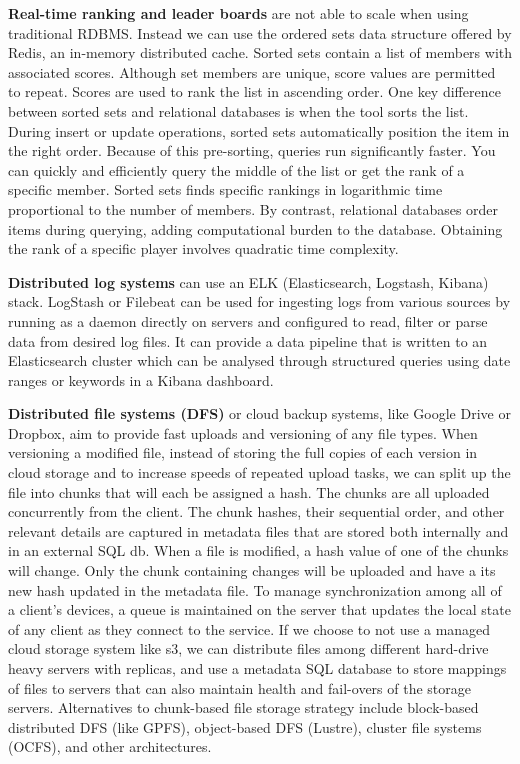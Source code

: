 \documentclass{article}
\begin{document}
    \textbf{Real-time ranking and leader boards} are not able to scale when using traditional RDBMS. Instead we can use the ordered sets data structure offered by Redis, an in-memory distributed cache. Sorted sets contain a list of members with associated scores. Although set members are unique, score values are permitted to repeat. Scores are used to rank the list in ascending order. One key difference between sorted sets and relational databases is when the tool sorts the list. During insert or update operations, sorted sets automatically position the item in the right order. Because of this pre-sorting, queries run significantly faster. You can quickly and efficiently query the middle of the list or get the rank of a specific member. Sorted sets finds specific rankings in logarithmic time proportional to the number of members. By contrast, relational databases order items during querying, adding computational burden to the database. Obtaining the rank of a specific player involves quadratic time complexity.
    
    \textbf{Distributed log systems} can use an ELK (Elasticsearch, Logstash, Kibana) stack. LogStash or Filebeat can be used for ingesting logs from various sources by running as a daemon directly on servers and configured to read, filter or parse data from desired log files. It can provide a data pipeline that is written to an Elasticsearch cluster which can be analysed through structured queries using date ranges or keywords in a Kibana dashboard.
    
    \textbf{Distributed file systems (DFS)} or cloud backup systems, like Google Drive or Dropbox, aim to provide fast uploads and versioning of any file types. When versioning a modified file, instead of storing the full copies of each version in cloud storage and to increase speeds of repeated upload tasks, we can split up the file into chunks that will each be assigned a hash. The chunks are all uploaded concurrently from the client. The chunk hashes, their sequential order, and other relevant details are captured in metadata files that are stored both internally and in an external SQL db. When a file is modified, a hash value of one of the chunks will change. Only the chunk containing changes will be uploaded and have a its new hash updated in the metadata file. To manage synchronization among all of a client's devices, a queue is maintained on the server that updates the local state of any client as they connect to the service. If we choose to not use a managed cloud storage system like s3, we can distribute files among different hard-drive heavy servers with replicas, and use a metadata SQL database to store mappings of files to servers that can also maintain health and fail-overs of the storage servers. Alternatives to chunk-based file storage strategy include block-based distributed DFS (like GPFS), object-based DFS (Lustre), cluster file systems (OCFS), and other architectures.
    
\end{document}
